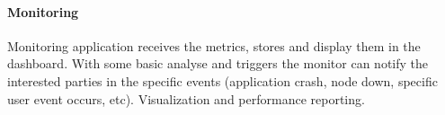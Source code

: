 \paragraph{Monitoring}
Monitoring application receives the metrics, stores and display them in the dashboard.
With some basic analyse and triggers the monitor can notify the interested parties in the specific events
(application crash, node down, specific user event occurs, etc).
Visualization and performance reporting.


